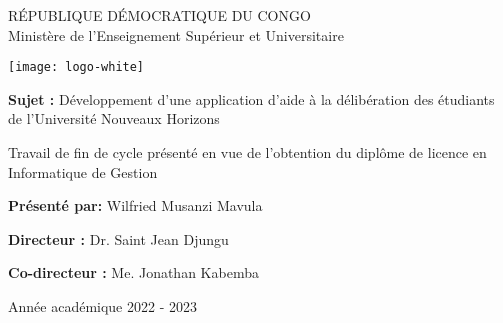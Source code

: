 \begin{center}
    \uppercase{République Démocratique du Congo} \\ \vspace*{0.2cm}
    Ministère de l'Enseignement Supérieur et Universitaire \\ \vspace*{0.4cm}

    \texttt{[image: logo-white]}

    \vspace{3cm}
    \Large{\textbf{Sujet : } Développement d'une application d'aide à la délibération des étudiants de l'Université Nouveaux Horizons}

    \vspace{3cm}
    \begin{flushright}
        Travail de fin de cycle présenté en vue de l'obtention du diplôme de licence en Informatique de Gestion
    \end{flushright}

    \vspace{2cm}
    \textbf{Présenté par:} Wilfried Musanzi Mavula

    \vspace{1cm}
    \textbf{Directeur :} Dr. Saint Jean Djungu

    \vspace{0.4cm}
    \textbf{Co-directeur :} Me. Jonathan Kabemba

    \vfill
    Année académique 2022 - 2023
\end{center}





